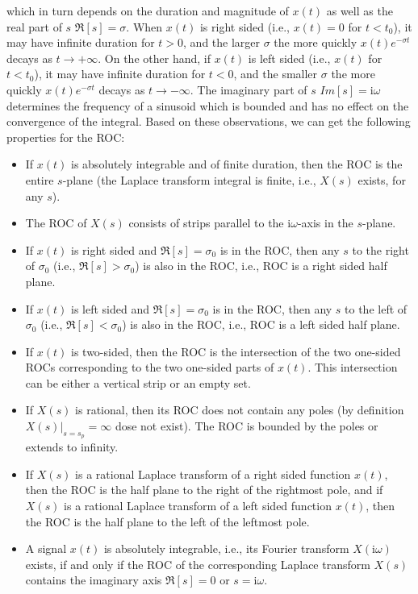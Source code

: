 	which in turn depends on the duration and magnitude of $x(t)$ as well as the real part of $s$ $\Re[s]=\sigma$. When $x(t)$ is right sided (i.e., $x(t)=0$ for $t<t_0$), it may have infinite duration for $t>0$, and the larger $\sigma$ the more quickly $x(t)e^{-\sigma t}$ decays as $t \rightarrow +\infty$. On the other hand, if $x(t)$ is left sided (i.e., $x(t)$ for $t<t_0$), it may have infinite duration for $t<0$, and the smaller $\sigma$ the more quickly $x(t)e^{-\sigma t}$ decays as $t \rightarrow -\infty$. The imaginary part of $s$ $Im[s]=\mathrm{i}\omega$ determines the frequency of a sinusoid which is bounded and has no effect on the convergence of the integral. Based on these observations, we can get the following properties for the ROC:	
	\begin{itemize}
	
	\item If $x(t)$ is absolutely integrable and of finite duration, then the ROC is the entire $s$-plane (the Laplace transform integral is finite, i.e., $X(s)$ exists, for any $s$).
	
	\item The ROC of $X(s)$ consists of strips parallel to the $\mathrm{i}\omega$-axis in the $s$-plane.
	
	\item If $x(t)$ is right sided and $\Re[s]=\sigma_0$ is in the ROC, then any $s$ to	the right of $\sigma_0$ (i.e., $\Re[s]>\sigma_0$) is also in the ROC, i.e., ROC is a right sided half plane.
	
	\item If $x(t)$ is left sided and $\Re[s]=\sigma_0$ is in the ROC, then any $s$ to the left of $\sigma_0$ (i.e., $\Re[s]<\sigma_0$) is also in the ROC, i.e., ROC is a left sided half plane.
	
	\item If $x(t)$ is two-sided, then the ROC is the intersection of the two one-sided ROCs corresponding to the two one-sided parts of $x(t)$. This intersection can be either a vertical strip or an empty set.
	
	\item If $X(s)$ is rational, then its ROC does not contain any poles (by definition $X(s)|_{s=s_p}=\infty$ dose not exist). The ROC is bounded by the poles or extends to infinity.
	
	\item If $X(s)$ is a rational Laplace transform of a right sided function $x(t)$, then the ROC is the half plane to the right of the rightmost pole, and if $X(s)$ is a rational Laplace transform of a left sided function $x(t)$, then the ROC is the half plane to the left of the leftmost pole.
	
	\item A signal $x(t)$ is absolutely integrable, i.e., its Fourier transform $X(\mathrm{i}\omega)$ exists, if and only if the ROC of the corresponding Laplace transform $X(s)$ contains the imaginary axis $\Re[s]=0$ or $s=\mathrm{i}\omega$.
	
	\end{itemize}
	
